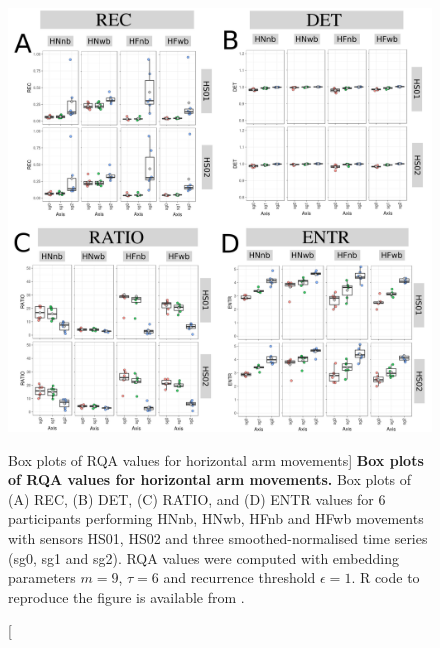 \begin{figure}
\centering
\includegraphics[width=1.0\textwidth]{BP-rqa-h}
	\caption
	[Box plots of RQA values for horizontal arm movements]{
	{\bf Box plots of RQA values for horizontal arm movements.}
	Box plots of (A) REC, (B) DET, (C) RATIO, and (D) ENTR values 
	for 6 participants performing HNnb, HNwb, HFnb and HFwb movements
	with sensors HS01, HS02 and three smoothed-normalised  
	time series (sg0, sg1 and sg2).
	RQA values were computed with 
	embedding parameters $m=9$, $\tau=6$ and recurrence threshold
	$\epsilon=1$.
	R code to reproduce the figure is available from \cite{hwum2018}.
        }
    \label{fig:BPRQAH}
\end{figure}
%


